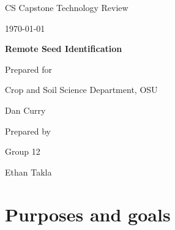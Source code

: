 \documentclass[onecolumn, draftclsnofoot,10pt, compsoc]{IEEEtran}
\def \CapstoneTeamName{		The Cleverly Named Team}
\def \CapstoneTeamNumber{		12}
\def \GroupMemberOne{			Ethan Takla}
\def \CapstoneProjectName{		Remote Seed Identification}
\def \CapstoneSponsorCompany{	Crop and Soil Science Department, OSU}
\def \CapstoneSponsorPerson{		Dan Curry}
\def \DocType{		%
				Technology Review
				}
\newcommand{\NameSigPair}[1]{\par
\makebox[2.75in][r]{#1} \hfil 	\makebox[3.25in]{\makebox[2.25in]{\hrulefill} \hfill		\makebox[.75in]{\hrulefill}}
\par\vspace{-12pt} \textit{\tiny\noindent
\makebox[2.75in]{} \hfil		\makebox[3.25in]{\makebox[2.25in][r]{Signature} \hfill	\makebox[.75in][r]{Date}}}}
\renewcommand{\NameSigPair}[1]{#1}
\begin{document}
\begin{titlepage}
    \begin{singlespace}
        \hfill 
        \par\vspace{.2in}
        \centering
        \scshape{
            \huge CS Capstone \DocType \par
            {\large\today}\par
            \vspace{.5in}
            \textbf{\Huge\CapstoneProjectName}\par
            \vfill
            {\large Prepared for}\par
            \Huge \CapstoneSponsorCompany\par
            \vspace{5pt}
            {\Large\NameSigPair{\CapstoneSponsorPerson}\par}
            {\large Prepared by }\par
            Group\CapstoneTeamNumber\par
            \vspace{5pt}
            {\Large
                \NameSigPair{\GroupMemberOne}\par
            }
            \vspace{20pt}
        }
    \end{singlespace}
\end{titlepage}
\newpage
{}
\tableofcontents
\clearpage

\section{Purposes and goals}
\end{document}
